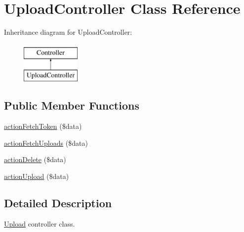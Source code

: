 \hypertarget{classUploadController}{
\section{UploadController Class Reference}
\label{classUploadController}
}
Inheritance diagram for UploadController:\begin{figure}[H]
\begin{center}
\leavevmode
\includegraphics[height=2.000000cm]{classUploadController}
\end{center}
\end{figure}
\subsection*{Public Member Functions}
\begin{DoxyCompactItemize}
\item 
\hyperlink{classUploadController_a4fa1e1e4e97f965fdcd852b0d53721bb}{actionFetchToken} (\$data)
\item 
\hyperlink{classUploadController_a65ec284e6637e13969f2c86ca17577d4}{actionFetchUploads} (\$data)
\item 
\hyperlink{classUploadController_a107d052c524ffab7de8adb67f296a5f9}{actionDelete} (\$data)
\item 
\hyperlink{classUploadController_a24a9ee619055e570ba66193ec2b378b1}{actionUpload} (\$data)
\end{DoxyCompactItemize}


\subsection{Detailed Description}
\hyperlink{classUpload}{Upload} controller class. 

